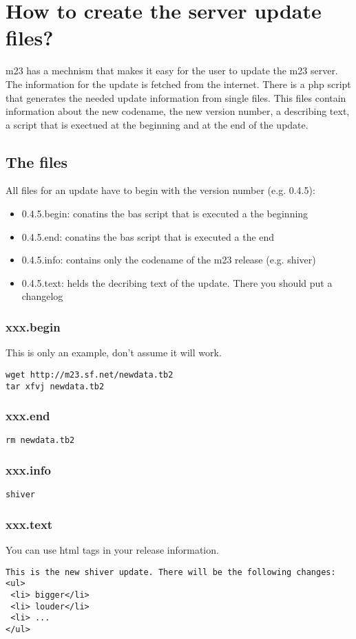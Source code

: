 \section{How to create the server update files?}
m23 has a mechnism that makes it easy for the user to update the m23 server. The information for the update is fetched from the internet. There is a php script that generates the needed update information from single files. This files contain information about the new codename, the new version number, a describing text, a script that is exectued at the beginning and at the end of the update.
\subsection{The files}
All files for an update have to begin with the version number (e.g. 0.4.5):
\begin{itemize}
\item 0.4.5.begin: conatins the bas script that is executed a the beginning
\item 0.4.5.end: conatins the bas script that is executed a the end
\item 0.4.5.info: contains only the codename of the m23 release (e.g. shiver)
\item 0.4.5.text: helds the decribing text of the update. There you should put a changelog
\end{itemize} 
\subsubsection{xxx.begin}
This is only an example, don't assume it will work.
\begin{verbatim}
wget http://m23.sf.net/newdata.tb2
tar xfvj newdata.tb2
\end{verbatim}
\subsubsection{xxx.end}
\begin{verbatim}
rm newdata.tb2
\end{verbatim}

\subsubsection{xxx.info}
\begin{verbatim}
shiver
\end{verbatim}

\subsubsection{xxx.text}
You can use html tags in your release information.
\begin{verbatim}
This is the new shiver update. There will be the following changes:
<ul>
 <li> bigger</li>
 <li> louder</li>
 <li> ...
</ul>
\end{verbatim} 